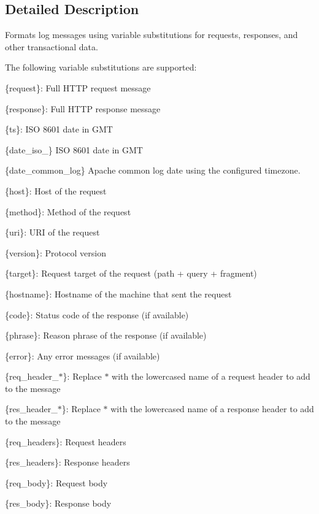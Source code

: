 \subsection{Detailed Description}
Formats log messages using variable substitutions for requests, responses, and other transactional data.

The following variable substitutions are supported\+:


\begin{DoxyItemize}
\item \{request\}\+: Full H\+T\+TP request message
\item \{response\}\+: Full H\+T\+TP response message
\item \{ts\}\+: I\+SO 8601 date in G\+MT
\item \{date\+\_\+iso\+\_\} I\+SO 8601 date in G\+MT
\item \{date\+\_\+common\+\_\+log\} Apache common log date using the configured timezone.
\item \{host\}\+: Host of the request
\item \{method\}\+: Method of the request
\item \{uri\}\+: U\+RI of the request
\item \{version\}\+: Protocol version
\item \{target\}\+: Request target of the request (path + query + fragment)
\item \{hostname\}\+: Hostname of the machine that sent the request
\item \{code\}\+: Status code of the response (if available)
\item \{phrase\}\+: Reason phrase of the response (if available)
\item \{error\}\+: Any error messages (if available)
\item \{req\+\_\+header\+\_\+$\ast$\}\+: Replace {\ttfamily $\ast$} with the lowercased name of a request header to add to the message
\item \{res\+\_\+header\+\_\+$\ast$\}\+: Replace {\ttfamily $\ast$} with the lowercased name of a response header to add to the message
\item \{req\+\_\+headers\}\+: Request headers
\item \{res\+\_\+headers\}\+: Response headers
\item \{req\+\_\+body\}\+: Request body
\item \{res\+\_\+body\}\+: Response body 
\end{DoxyItemize}

